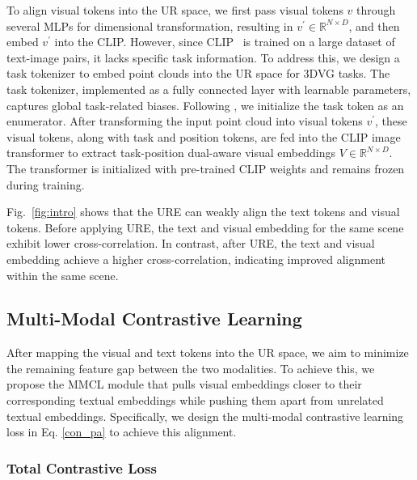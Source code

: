 \documentclass[lettersize,journal]{IEEEtran}
\begin{document}
To align visual tokens into the UR space, we first pass visual tokens $v$ through several MLPs for dimensional transformation, resulting in $v^{\prime} \in \mathbb{R}^{N \times D}$, and then embed $v^{\prime}$ into the CLIP.
However, since CLIP~\cite{clip} is trained on a large dataset of text-image pairs, it lacks specific task information. To address this, we design a task tokenizer to embed point clouds into the UR space for 3DVG tasks. The task tokenizer, implemented as a fully connected layer with learnable parameters, captures global task-related biases. Following \cite{P-Tuning-v2}, we initialize the task token as an enumerator. After transforming the input point cloud into visual tokens $v^{\prime}$, these visual tokens, along with task and position tokens, are fed into the CLIP image transformer to extract task-position dual-aware visual embeddings $V \in \mathbb{R}^{N \times D}$. The transformer is initialized with pre-trained CLIP weights and remains frozen during training.

Fig.~\textcolor{red}{\ref{fig:intro}} shows that the URE can weakly align the text tokens and visual tokens. Before applying URE, the text and visual embedding for the same scene exhibit lower cross-correlation. In contrast, after URE, the text and visual embedding
achieve a higher cross-correlation, indicating improved alignment within the same scene.


\subsection{Multi-Modal Contrastive Learning} 
\label{sec33}
After mapping the visual and text tokens into the UR space, we aim to minimize the remaining feature gap between the two modalities.  To achieve this, we propose the MMCL module that pulls visual embeddings closer to their corresponding textual embeddings while pushing them apart from unrelated textual embeddings.
Specifically, we design the multi-modal contrastive learning loss in Eq. \textcolor{red}{\ref{con_pa}} to achieve this alignment.

\subsubsection{Total Contrastive Loss}
\end{document}
